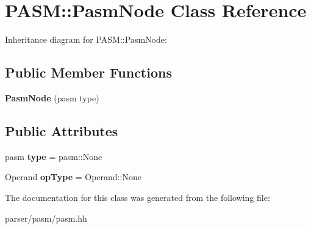 \hypertarget{classPASM_1_1PasmNode}{}\section{P\+A\+SM\+:\+:Pasm\+Node Class Reference}
\label{classPASM_1_1PasmNode}


Inheritance diagram for P\+A\+SM\+:\+:Pasm\+Node\+:
\subsection*{Public Member Functions}
\begin{DoxyCompactItemize}
\item 
\mbox{\label{classPASM_1_1PasmNode_ab6330ad961a1a5a8b0b4ca9db0ee1771}} 
{\bfseries Pasm\+Node} (pasm type)
\end{DoxyCompactItemize}
\subsection*{Public Attributes}
\begin{DoxyCompactItemize}
\item 
\mbox{\label{classPASM_1_1PasmNode_ab22b77cba819418cc1229db08f078e58}} 
pasm {\bfseries type} = pasm\+::\+None
\item 
\mbox{\label{classPASM_1_1PasmNode_a4fa117c4f4594c43ecff225081cfe2fd}} 
Operand {\bfseries op\+Type} = Operand\+::\+None
\end{DoxyCompactItemize}


The documentation for this class was generated from the following file\+:\begin{DoxyCompactItemize}
\item 
parser/pasm/pasm.\+hh\end{DoxyCompactItemize}
